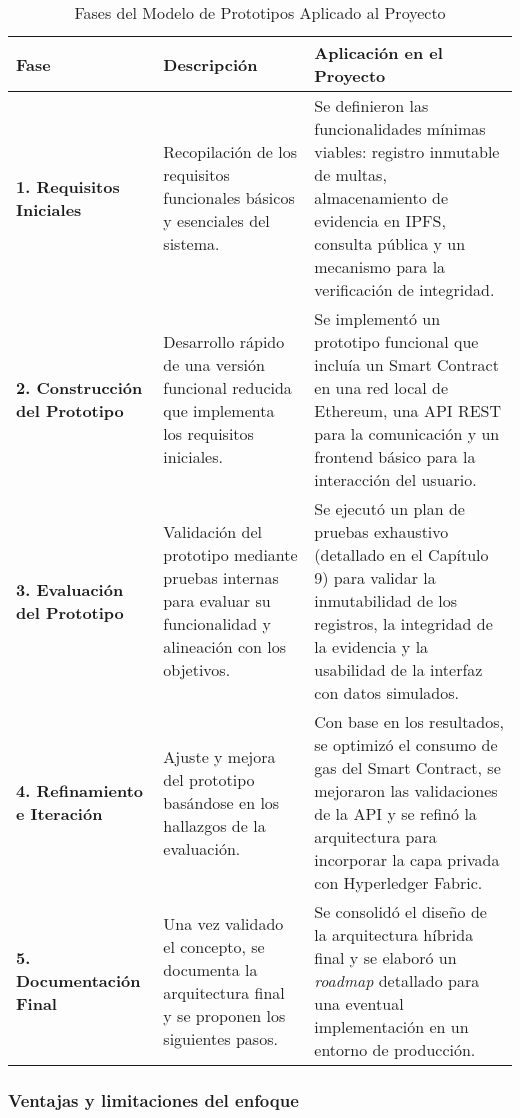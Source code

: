 \begin{table}[h]
\centering
\caption{Fases del Modelo de Prototipos Aplicado al Proyecto}
\label{tab:fases_prototipos}
\begin{tabular}{|p{3cm}|p{5cm}|p{6cm}|}
\hline
\textbf{Fase} & \textbf{Descripción} & \textbf{Aplicación en el Proyecto} \\ \hline
\textbf{1. Requisitos Iniciales} & Recopilación de los requisitos funcionales básicos y esenciales del sistema. & Se definieron las funcionalidades mínimas viables: registro inmutable de multas, almacenamiento de evidencia en IPFS, consulta pública y un mecanismo para la verificación de integridad. \\ \hline
\textbf{2. Construcción del Prototipo} & Desarrollo rápido de una versión funcional reducida que implementa los requisitos iniciales. & Se implementó un prototipo funcional que incluía un Smart Contract en una red local de Ethereum, una API REST para la comunicación y un frontend básico para la interacción del usuario. \\ \hline
\textbf{3. Evaluación del Prototipo} & Validación del prototipo mediante pruebas internas para evaluar su funcionalidad y alineación con los objetivos. & Se ejecutó un plan de pruebas exhaustivo (detallado en el Capítulo 9) para validar la inmutabilidad de los registros, la integridad de la evidencia y la usabilidad de la interfaz con datos simulados. \\ \hline
\textbf{4. Refinamiento e Iteración} & Ajuste y mejora del prototipo basándose en los hallazgos de la evaluación. & Con base en los resultados, se optimizó el consumo de gas del Smart Contract, se mejoraron las validaciones de la API y se refinó la arquitectura para incorporar la capa privada con Hyperledger Fabric. \\ \hline
\textbf{5. Documentación Final} & Una vez validado el concepto, se documenta la arquitectura final y se proponen los siguientes pasos. & Se consolidó el diseño de la arquitectura híbrida final y se elaboró un \textit{roadmap} detallado para una eventual implementación en un entorno de producción. \\ \hline
\end{tabular}
\end{table}

\subsubsection{Ventajas y limitaciones del enfoque}

